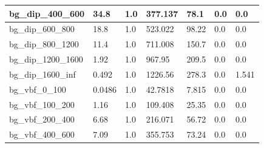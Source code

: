 \documentclass[a4paper, 10pt]{article}
\begin{document}
\begin{table}[H]
\begin{center}
\begin{tabular}{|m{23.0mm}|m{23.0mm}|m{18.0mm}|m{19.0mm}|m{19.0mm}|m{19.0mm}|m{19.0mm}|}
      \hline
      {\cellcolor{white}         bg\_dip\_400\_600}& {\cellcolor{white}         34.8}& {\cellcolor{white}         1.0}& {\cellcolor{white}         377.137}& {\cellcolor{white}         78.1}& {\cellcolor{green}         0.0}& {\cellcolor{green}         0.0}\\
      \hline
      {\cellcolor{white}         bg\_dip\_600\_800}& {\cellcolor{white}         18.8}& {\cellcolor{white}         1.0}& {\cellcolor{white}         523.022}& {\cellcolor{white}         98.22}& {\cellcolor{green}         0.0}& {\cellcolor{green}         0.0}\\
      \hline
      {\cellcolor{white}         bg\_dip\_800\_1200}& {\cellcolor{white}         11.4}& {\cellcolor{white}         1.0}& {\cellcolor{white}         711.008}& {\cellcolor{white}         150.7}& {\cellcolor{green}         0.0}& {\cellcolor{green}         0.0}\\
      \hline
      {\cellcolor{white}         bg\_dip\_1200\_1600}& {\cellcolor{white}         1.92}& {\cellcolor{white}         1.0}& {\cellcolor{white}         967.95}& {\cellcolor{white}         209.5}& {\cellcolor{green}         0.0}& {\cellcolor{green}         0.0}\\
      \hline
      {\cellcolor{white}         bg\_dip\_1600\_inf}& {\cellcolor{white}         0.492}& {\cellcolor{white}         1.0}& {\cellcolor{white}         1226.56}& {\cellcolor{white}         278.3}& {\cellcolor{green}         0.0}& {\cellcolor{green}         1.541}\\
      \hline
      {\cellcolor{white}         bg\_vbf\_0\_100}& {\cellcolor{white}         0.0486}& {\cellcolor{white}         1.0}& {\cellcolor{white}         42.7818}& {\cellcolor{white}         7.815}& {\cellcolor{green}         0.0}& {\cellcolor{green}         0.0}\\
      \hline
      {\cellcolor{white}         bg\_vbf\_100\_200}& {\cellcolor{white}         1.16}& {\cellcolor{white}         1.0}& {\cellcolor{white}         109.408}& {\cellcolor{white}         25.35}& {\cellcolor{green}         0.0}& {\cellcolor{green}         0.0}\\
      \hline
      {\cellcolor{white}         bg\_vbf\_200\_400}& {\cellcolor{white}         6.68}& {\cellcolor{white}         1.0}& {\cellcolor{white}         216.071}& {\cellcolor{white}         56.72}& {\cellcolor{green}         0.0}& {\cellcolor{green}         0.0}\\
      \hline
      {\cellcolor{white}         bg\_vbf\_400\_600}& {\cellcolor{white}         7.09}& {\cellcolor{white}         1.0}& {\cellcolor{white}         355.753}& {\cellcolor{white}         73.24}& {\cellcolor{green}         0.0}& {\cellcolor{green}         0.0}\\

\end{tabular}
\end{center}
\end{table}
\end{document}
